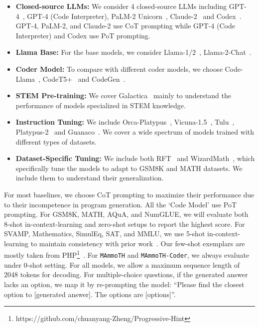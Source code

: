 \begin{itemize}[leftmargin=*,itemsep=0pt, topsep=0pt, partopsep=0pt]
\item \textbf{Closed-source LLMs:} We consider 4 closed-source LLMs including GPT-4~\citep{OpenAI2023GPT4TR}, GPT-4 (Code Interpreter), PaLM-2 Unicorn~\citep{anil2023palm}, Claude-2~\citep{bai2022constitutional} and Codex~\citep{chen2021evaluating}. GPT-4, PaLM-2, and Claude-2 use CoT prompting while  GPT-4 (Code Interpreter) and Codex use PoT prompting.
\item \textbf{Llama Base:} For the base models, we consider Llama-1/2~\citep{touvron2023llama1,touvron2023llama2}, Llama-2-Chat~\citep{touvron2023llama2}.
\item \textbf{Coder Model:} To compare with different coder models, we choose Code-Llama~\citep{roziere2023code}, CodeT5+~\citep{wang2023codet5+} and CodeGen~\citep{nijkamp2023codegen}.
\item \textbf{STEM Pre-training:} We cover Galactica~\citep{taylor2022galactica} mainly to understand the performance of models specialized in STEM knowledge.
\item \textbf{Instruction Tuning:} We include Orca-Platypus~\citep{mukherjee2023orca}, Vicuna-1.5~\citep{zheng2023judging}, Tulu~\citep{wang2023far}, Platypus-2~\citep{lee2023platypus} and Guanaco~\citep{dettmers2023qlora}. We cover a wide spectrum of models trained with different types of datasets. 
\item \textbf{Dataset-Specific Tuning:} We include both RFT~\citep{yuan2023scaling} and WizardMath~\citep{luo2023wizardmath}, which specifically tune the models to adapt to GSM8K and MATH datasets. We include them to understand their generalization.
\end{itemize}

For most baselines, we choose CoT prompting to maximize their performance due to their incompetence in program generation. All the `Code Model' use PoT prompting. For GSM8K, MATH, AQuA, and NumGLUE, we will evaluate both 8-shot in-context-learning and zero-shot setups to report the highest score. For SVAMP, Mathematics, SimulEq, SAT, and MMLU, we use 5-shot in-context-learning to maintain consistency with prior work~\citep{wei2022chain,chen2023theoremqa}. Our few-shot exemplars are mostly taken from PHP\footnote{https://github.com/chuanyang-Zheng/Progressive-Hint}~\citep{zheng2023progressive}.
For \texttt{MAmmoTH} and \texttt{MAmmoTH-Coder}, we always evaluate under 0-shot setting. For all models, we allow a maximum sequence length of 2048 tokens for decoding. For multiple-choice questions, if the generated answer lacks an option, we map it by re-prompting the model: ``Please find the closest option to [generated answer]. The options are [options]''.

